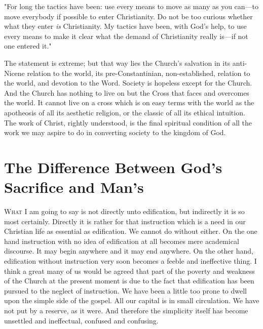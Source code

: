 \documentclass[draft]{ptfdoc}
\begin{document}
"For long the tactics have been: use every 
means to move as many as you can---to move 
everybody if possible to enter Christianity. 
Do not be too curious whether what they enter 
\textit{is} Christianity. My tactics have been, with 
God's help, to use every means to make it clear 
what the demand of Christianity really is---if 
not one entered it." 

The statement is extreme; but that way lies 
the Church's salvation in its anti-Nicene relation 
to the world, its pre-Constantinian, non-established, relation to the world, and devotion 
to the Word. Society is hopeless except for the 
Church. And the Church has nothing to live on 
but the Cross that faces and overcomes the 
world. It cannot live on a cross which is on 
easy terms with the world as the apotheosis of 
all its aesthetic religion, or the classic of all its 
ethical intuition. The work of Christ, rightly 
understood, is the final spiritual condition of all 
the work we may aspire to do in converting 
society to the kingdom of God. 



\tableofcontents

\mainmatter

\chapter{The Difference Between God's Sacrifice and Man's} 






\textsc{What} I am going to say is not directly unto 
edification, but indirectly it is so most 
certainly. Directly it is rather for that instruction 
which is a need in our Christian life as 
essential as edification. We cannot do without 
either. On the one hand instruction with no idea 
of edification at all becomes mere academical 
discourse. It may begin anywhere and it may 
end anywhere. On the other hand, edification 
without instruction very soon becomes a feeble 
and ineffective thing. I think a great many of 
us would be agreed that part of the poverty 
and weakness of the Church at the present 
moment is due to the fact that edification has 
been pursued to the neglect of instruction. We 
have been a little too prone to dwell upon the 
simple side of the gospel. All our capital is in
small circulation. We have not put by a reserve, 
as it were. And therefore the simplicity 
itself has become unsettled and ineffectual, confused 
and confusing. 
\end{document}
